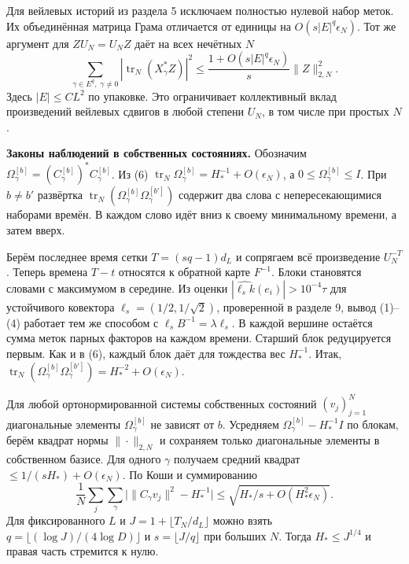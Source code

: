 \documentclass[11pt,a4paper]{article}
\newcommand{\trn}{\operatorname{tr}_N}
\newcommand{\subt}[1]{\par\medskip\noindent\textbf{#1.}\quad}
\begin{document}
Для вейлевых историй из раздела 5 исключаем полностью нулевой набор меток. Их объединённая матрица Грама отличается от единицы на \(O(s|E|^q\epsilon_N)\). Тот же аргумент для \(Z U_N=U_N Z\) даёт на всех нечётных \(N\)
\[
      \sum_{\gamma\in E^q,\;\gamma\ne0}
          |\trn(X_\gamma^* Z)|^2
          \le \frac{1+O(s|E|^q\epsilon_N)}{s}\|Z\|_{2,N}^2 .
\]
Здесь \(|E|\le C L^2\) по упаковке. Это ограничивает коллективный вклад произведений вейлевых сдвигов в любой степени \(U_N\), в том числе при простых \(N\).

\subt{Законы наблюдений в собственных состояниях}
Обозначим \(\Omega_\gamma^{[b]}=(C_\gamma^{[b]})^*C_\gamma^{[b]}\). Из (6) \(\trn\Omega_\gamma^{[b]}=H_*^{-1}+O(\epsilon_N)\), а \(0\le\Omega_\gamma^{[b]}\le I\). При \(b\ne b'\) развёртка \(\trn(\Omega_\gamma^{[b]}\Omega_\gamma^{[b']})\) содержит два слова с непересекающимися наборами времён. В каждом слово идёт вниз к своему минимальному времени, а затем вверх.

Берём последнее время сетки \(T=(sq-1)d_L\) и сопрягаем всё произведение \(U_N^{-T}\). Теперь времена \(T-t\) относятся к обратной карте \(F^{-1}\). Блоки становятся словами с максимумом в середине. Из оценки \(|\widehat{\ell_s k}(e_i)|>10^{-4}\tau\) для устойчивого ковектора \(\ell_s=(1/2,1/\sqrt2)\), проверенной в разделе 9, вывод (1)--(4) работает тем же способом с \(\ell_s B^{-1}=\lambda\ell_s\). В каждой вершине остаётся сумма меток парных факторов на каждом времени. Старший блок редуцируется первым. Как и в (6), каждый блок даёт для тождества вес \(H_*^{-1}\). Итак,
\(\trn(\Omega_\gamma^{[b]}\Omega_\gamma^{[b']})=H_*^{-2}+O(\epsilon_N)\).

Для любой ортонормированной системы собственных состояний \((v_j)_{j=1}^N\) диагональные элементы \(\Omega_\gamma^{[b]}\) не зависят от \(b\). Усредняем \(\Omega_\gamma^{[b]}-H_*^{-1}I\) по блокам, берём квадрат нормы \(\|\cdot\|_{2,N}\) и сохраняем только диагональные элементы в собственном базисе. Для одного \(\gamma\) получаем средний квадрат \(\le1/(sH_*)+O(\epsilon_N)\). По Коши и суммированию
\[
 \frac1N\sum_j\sum_\gamma
       \big|\|C_\gamma v_j\|^2-H_*^{-1}\big|
                  \le \sqrt{H_*/s+O(H_*^2\epsilon_N)} .          \tag{9}
\]
Для фиксированного \(L\) и \(J=1+\lfloor T_N/d_L\rfloor\) можно взять
\(q=\lfloor(\log J)/(4\log D)\rfloor\) и \(s=\lfloor J/q\rfloor\) при больших \(N\). Тогда \(H_*\le J^{1/4}\) и правая часть стремится к нулю.
\end{document}
